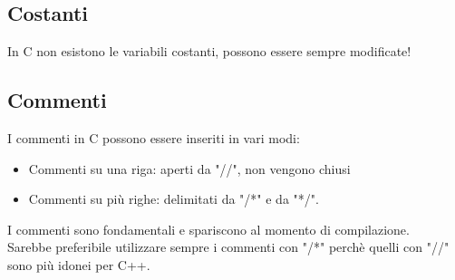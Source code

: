 \documentclass[12pt,a4paper]{article}
\begin{document}
\subsection{Costanti}
In C non esistono le variabili costanti, possono essere sempre modificate!
\subsection{Commenti}
I commenti in C possono essere inseriti in vari modi:
\begin{itemize}
    \item Commenti su una riga: aperti da "//", non vengono chiusi
    \item Commenti su più righe: delimitati da "/*" e da "*/".
\end{itemize}
I commenti sono fondamentali e spariscono al momento di compilazione.\\
Sarebbe preferibile utilizzare sempre i commenti con "/*" perchè quelli con "//" sono più idonei per C++.
\end{document}
